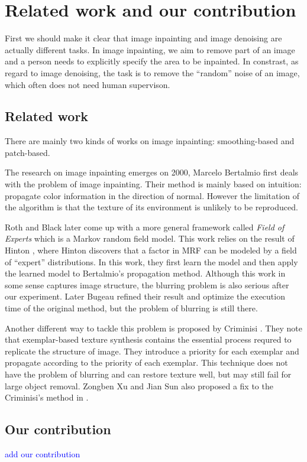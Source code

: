 \section{Related work and our contribution}
First we should make it clear that image inpainting and image denoising are
actually different tasks. In image inpainting, we aim to remove part of 
an image and a person needs to explicitly specify the area to be inpainted.
In constrast, as regard to image denoising, the task is to remove the 
``random'' noise of an image, which often does not need human supervison.
\subsection{Related work}
There are mainly two kinds of works on image inpainting: smoothing-based and
patch-based.

The research on image inpainting emerges on 2000, Marcelo Bertalmio \etal
\cite{siggraph00} first deals with the problem of image inpainting. Their
method is mainly based on intuition: propagate color information in the
direction of normal. However the limitation of the algorithm is that the
texture of its environment is unlikely to be reproduced.

Roth and Black \cite{cvpr05} later come up with a more general framework 
called \emph{Field of Experts} which is a Markov random field model. This
work relies on the result of Hinton \cite{neco02, nips02}, where Hinton discovers
that a factor in MRF can be modeled by a field of ``expert'' distributions.
In this work, they first learn the model and then apply the learned model
to Bertalmio's propagation method. Although this work in some sense captures
image structure, the blurring problem is also serious after our experiment. Later Bugeau\etal \cite{tip10} refined their result and optimize the execution time of the original method, but the problem of blurring is still there.

Another different way to tackle this problem is proposed by Criminisi \etal
 \cite{cvpr03,tip04}. They note that exemplar-based texture synthesis
 contains the essential process requred to replicate the structure of image.
 They introduce a priority for each exemplar and propagate according to
 the priority of each exemplar. This technique does not have the problem
 of blurring and can restore texture well, but may still fail for large
 object removal. Zongben Xu and Jian Sun also proposed a fix to the Criminisi's method in \cite{tip10sj}.

\subsection{Our contribution}
\textcolor{blue}{add our contribution}
